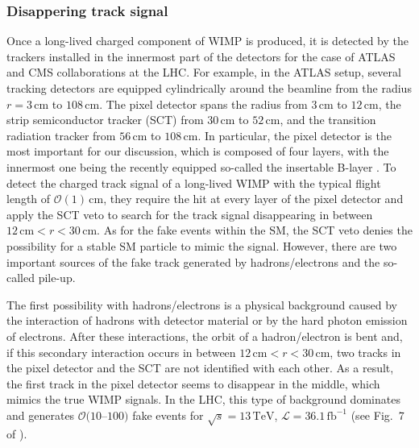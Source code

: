 \documentclass[12pt,twoside,book]{article}
\begin{document}
\subsubsection*{Disappering track signal}

Once a long-lived charged component of WIMP is produced, it is detected by the trackers installed in the innermost part of the detectors for the case of ATLAS and CMS collaborations at the LHC.
For example, in the ATLAS setup, several tracking detectors are equipped cylindrically around the beamline from the radius $r = 3\,\mathrm{cm}$ to $108\,\mathrm{cm}$.
The pixel detector spans the radius from $3\,\mathrm{cm}$ to $12\,\mathrm{cm}$, the strip semiconductor tracker (SCT) from $30\,\mathrm{cm}$ to $52\,\mathrm{cm}$, and the transition radiation tracker from $56\,\mathrm{cm}$ to $108\,\mathrm{cm}$.
In particular, the pixel detector is the most important for our discussion, which is composed of four layers, with the innermost one being the recently equipped so-called the insertable B-layer \cite{Capeans:1291633, CERN-LHCC-2012-009, Abbott:2018ikt}.
To detect the charged track signal of a long-lived WIMP with the typical flight length of $\mathcal{O} (1)\, \mathrm{cm}$, they require the hit at every layer of the pixel detector and apply the SCT veto to search for the track signal disappearing in between $12\,\mathrm{cm} < r < 30\,\mathrm{cm}$.
As for the fake events within the SM, the SCT veto denies the possibility for a stable SM particle to mimic the signal.
However, there are two important sources of the fake track generated by hadrons/electrons and the so-called pile-up.

The first possibility with hadrons/electrons is a physical background caused by the interaction of hadrons with detector material or by the hard photon emission of electrons.
After these interactions, the orbit of a hadron/electron is bent and, if this secondary interaction occurs in between $12\,\mathrm{cm} < r < 30\,\mathrm{cm}$, two tracks in the pixel detector and the SCT are not identified with each other.
As a result, the first track in the pixel detector seems to disappear in the middle, which mimics the true WIMP signals.
In the LHC, this type of background dominates and generates $\mathcal{O}(10$--$100)$ fake events for $\sqrt{s}=13\,\mathrm{TeV}$, $\mathcal{L} = 36.1\,\mathrm{fb}^{-1}$ (see Fig.~7 of \cite{Aaboud:2017mpt}).
\end{document}

